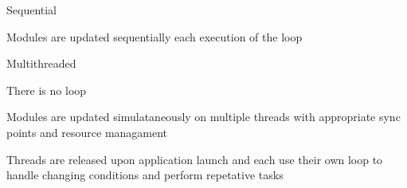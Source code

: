 
\begin{DoxyItemize}
\item Sequential
\begin{DoxyItemize}
\item Modules are updated sequentially each execution of the loop
\end{DoxyItemize}
\item Multithreaded
\begin{DoxyItemize}
\item There is no loop
\item Modules are updated simulataneously on multiple threads with appropriate sync points and resource managament
\item Threads are released upon application launch and each use their own loop to handle changing conditions and perform repetative tasks 
\end{DoxyItemize}
\end{DoxyItemize}